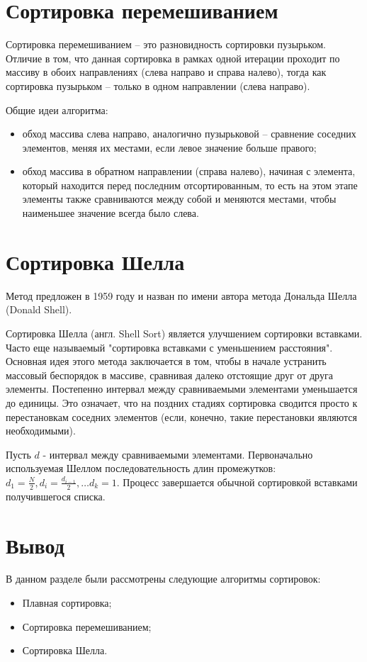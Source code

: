 \section{Сортировка перемешиванием}
Сортировка перемешиванием \cite{shaker} -- это разновидность сортировки пузырьком. Отличие в том, что данная сортировка в рамках одной итерации проходит по массиву в обоих направлениях (слева направо и справа налево), тогда как сортировка пузырьком -- только в одном направлении (слева направо).

Общие идеи алгоритма:
\begin{itemize}
	\item обход массива слева направо, аналогично пузырьковой -- сравнение соседних элементов, меняя их местами, если левое значение больше правого;
	\item обход массива в обратном направлении (справа налево), начиная с элемента, который находится перед последним отсортированным, то есть на этом этапе элементы также сравниваются между собой и меняются местами, чтобы наименьшее значение всегда было слева.
\end{itemize}
\section{Сортировка Шелла}
Метод предложен в 1959 году и назван по имени автора метода Дональда Шелла (Donald Shell). 

Сортировка Шелла \cite{book_lipachev, book_sort_algorithms, book_knut} (англ. Shell Sort) является улучшением сортировки вставками. Часто еще называемый "сортировка вставками с уменьшением расстояния". Основная идея этого метода заключается в том, чтобы в начале устранить массовый беспорядок в массиве, сравнивая далеко
отстоящие друг от друга элементы. Постепенно интервал между сравниваемыми элементами уменьшается до единицы. Это означает, что на поздних стадиях сортировка сводится просто к перестановкам соседних элементов (если, конечно, такие перестановки являются необходимыми).

Пусть $d$ - интервал между сравниваемыми элементами. Первоначально используемая Шеллом последовательность длин промежутков: $d_1 = \frac{N}{2}, d_{i} = \frac{d_{i - 1}}{2}, … d_k = 1$. Процесс завершается обычной сортировкой вставками получившегося списка.
\section*{Вывод}
В данном разделе были рассмотрены следующие алгоритмы сортировок: 
\begin{itemize}    
    \item Плавная сортировка;
    \item Сортировка перемешиванием;
    \item Сортировка Шелла.
\end{itemize}
\clearpage
